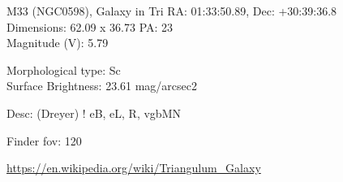 \begin{block}{M33 (NGC0598), Galaxy in Tri}
    RA: 01:33:50.89, Dec: +30:39:36.8 \\ 
    Dimensions: 62.09 x 36.73 PA: 23 \\ 
    Magnitude (V): 5.79

    Morphological type: Sc \\ 
    Surface Brightness: 23.61 mag/arcsec2 

    Desc: (Dreyer) ! eB, eL, R, vgbMN 

    Finder fov: 120 

    \url{https://en.wikipedia.org/wiki/Triangulum_Galaxy} 
\end{block}